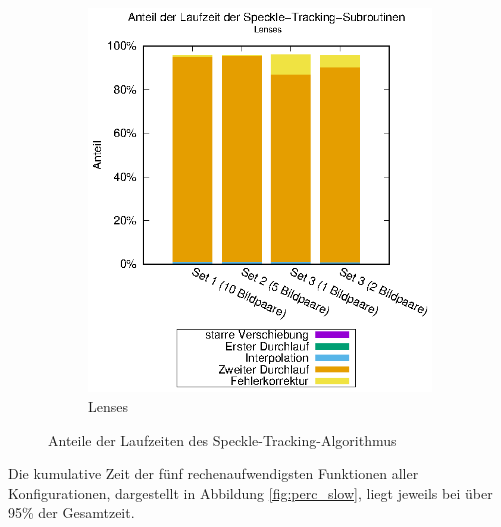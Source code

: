 \begin{center}
\begin{figure}[htbp]
\begin{subfigure}[b]{0.5\textwidth}
			\includegraphics[width=\textwidth]{pdf/speckle_lenses}
			\caption{Lenses}
			\label{fig:perc_speckle_lenses}
		\end{subfigure}
		\caption{Anteile der Laufzeiten des Speckle-Tracking-Algorithmus}
		\label{fig:perc_speckle}
	\end{figure}
\end{center}

Die kumulative Zeit der fünf rechenaufwendigsten Funktionen aller Konfigurationen, dargestellt in Abbildung \ref{fig:perc_slow}, liegt jeweils bei über 95\% der Gesamtzeit. 

